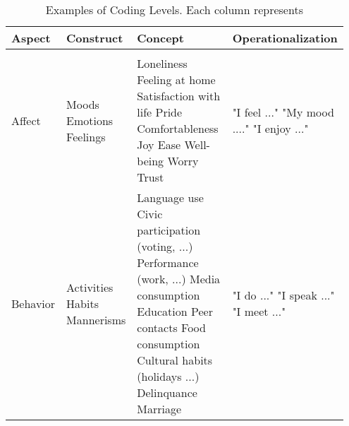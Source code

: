 \begin{table}%
\caption{Examples of Coding Levels. Each column represents}
\label{tab:AspectExamples} 
\begin{tabular}{>{\raggedright\arraybackslash}p{0.15\linewidth} 
>{\raggedright\arraybackslash}p{0.20\linewidth} 
>{\raggedright\arraybackslash}p{0.35\linewidth} 
>{\raggedright\arraybackslash}p{0.25\linewidth}}
\hline 
Aspect & Construct & Concept & Operationalization \\ 
\hline \\ [-0.5em]
Affect & 
Moods \linebreak Emotions \linebreak Feelings \linebreak & 
Loneliness \linebreak Feeling at home \linebreak Satisfaction with life \linebreak Pride \linebreak Comfortableness \linebreak Joy \linebreak Ease \linebreak Well-being \linebreak Worry \linebreak Trust \linebreak & 
"I feel ..." \linebreak "My mood ...." \linebreak "I enjoy ..." \linebreak \\

Behavior & 
Activities \linebreak Habits \linebreak Mannerisms \linebreak & 
Language use \linebreak Civic participation (voting, ...) \linebreak Performance (work, ...) \linebreak Media consumption \linebreak Education \linebreak Peer contacts \linebreak Food consumption \linebreak Cultural habits (holidays ...) \linebreak Delinquance \linebreak Marriage \linebreak & 
"I do ..." \linebreak "I speak ..." \linebreak "I meet ..." \linebreak \\ 


\end{tabular}
\end{table}
